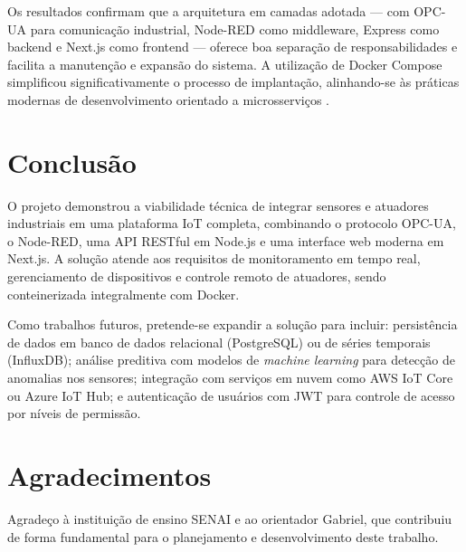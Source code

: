 \documentclass[12pt]{unisenaiclass}
\begin{document}
Os resultados confirmam que a arquitetura em camadas adotada — com OPC-UA para comunicação
industrial, Node-RED como middleware, Express como backend e Next.js como frontend —
oferece boa separação de responsabilidades e facilita a manutenção e expansão do sistema.
A utilização de Docker Compose simplificou significativamente o processo de implantação,
alinhando-se às práticas modernas de desenvolvimento orientado a microsserviços
\cite{rodrigues2024}.

\section{Conclusão}

O projeto demonstrou a viabilidade técnica de integrar sensores e atuadores industriais em
uma plataforma IoT completa, combinando o protocolo OPC-UA, o Node-RED, uma API RESTful em
Node.js e uma interface web moderna em Next.js. A solução atende aos requisitos de
monitoramento em tempo real, gerenciamento de dispositivos e controle remoto de atuadores,
sendo conteinerizada integralmente com Docker.

Como trabalhos futuros, pretende-se expandir a solução para incluir: persistência de dados
em banco de dados relacional (PostgreSQL) ou de séries temporais (InfluxDB); análise
preditiva com modelos de \textit{machine learning} para detecção de anomalias nos sensores;
integração com serviços em nuvem como AWS IoT Core ou Azure IoT Hub; e autenticação de
usuários com JWT para controle de acesso por níveis de permissão.

\section*{Agradecimentos}

Agradeço à instituição de ensino SENAI e ao orientador Gabriel, que contribuiu de forma
fundamental para o planejamento e desenvolvimento deste trabalho.

\printbibliography
\end{document}
